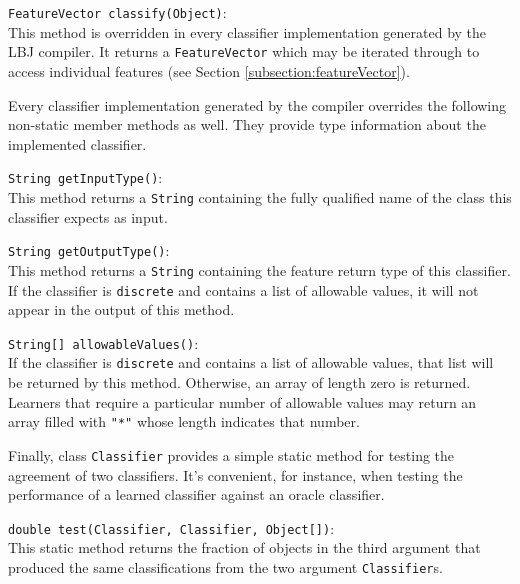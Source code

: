 \begin{list}{}{}
\item[{\tt FeatureVector classify(Object)}:] ~\\
This method is overridden in every classifier implementation generated by the
LBJ compiler.  It returns a {\tt FeatureVector} which may be iterated through
to access individual features (see Section \ref{subsection:featureVector}).
\end{list}

Every classifier implementation generated by the compiler overrides the
following non-static member methods as well.  They provide type information
about the implemented classifier.

\begin{list}{}{}
\item[{\tt String getInputType()}:] ~\\
This method returns a {\tt String} containing the fully qualified name of the
class this classifier expects as input.

\item[{\tt String getOutputType()}:] ~\\
This method returns a {\tt String} containing the feature return type of this
classifier.  If the classifier is {\tt discrete} and contains a list of
allowable values, it will not appear in the output of this method.

\item[{\tt String[] allowableValues()}:] ~\\
If the classifier is {\tt discrete} and contains a list of allowable values,
that list will be returned by this method.  Otherwise, an array of length zero
is returned.  Learners that require a particular number of allowable values
may return an array filled with {\tt "*"} whose length indicates that number.
\end{list}

Finally, class {\tt Classifier} provides a simple static method for testing
the agreement of two classifiers.  It's convenient, for instance, when testing
the performance of a learned classifier against an oracle classifier.

\begin{list}{}{}
\item[{\tt double test(Classifier, Classifier, Object[])}:] ~\\
This static method returns the fraction of objects in the third argument that
produced the same classifications from the two argument {\tt Classifier}s.
\end{list}

